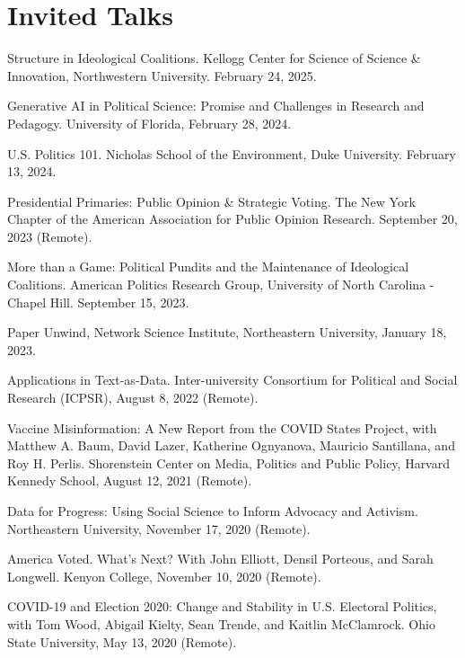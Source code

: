 \documentclass[letterpaper]{article}
\renewenvironment{itemize}{
  \begin{list}{}{
    \setlength{\leftmargin}{1.5em}
  }
}{
  \end{list}
}
\begin{document}
\section*{Invited Talks}
\begin{itemize}

\item Structure in Ideological Coalitions. Kellogg Center for Science of Science \& Innovation, Northwestern University. February 24, 2025.

\item Generative AI in Political Science: Promise and Challenges in Research and Pedagogy. University of Florida, February 28, 2024.

\item U.S. Politics 101. Nicholas School of the Environment, Duke University. February 13, 2024.

\item Presidential Primaries: Public Opinion \& Strategic Voting. The New York Chapter of the American Association for Public Opinion Research. September 20, 2023 (Remote).

\item More than a Game: Political Pundits and the Maintenance of Ideological Coalitions. American Politics Research Group, University of North Carolina - Chapel Hill. September 15, 2023.

\item Paper Unwind, Network Science Institute, Northeastern University, January 18, 2023.

\item Applications in Text-as-Data. Inter-university Consortium for Political and Social Research (ICPSR), August 8, 2022 (Remote). 

\item Vaccine Misinformation: A New Report from the COVID States Project, with Matthew A. Baum, David Lazer, Katherine Ognyanova, Mauricio Santillana, and Roy H. Perlis. Shorenstein Center on Media, Politics and Public Policy, Harvard Kennedy School, August 12, 2021 (Remote).

\item Data for Progress: Using Social Science to Inform Advocacy and Activism. Northeastern University, November 17, 2020 (Remote). 

\item America Voted. What's Next? With John Elliott, Densil Porteous, and Sarah Longwell. Kenyon College, November 10, 2020 (Remote). 

\item COVID-19 and Election 2020: Change and Stability in U.S. Electoral Politics, with Tom Wood, Abigail Kielty, Sean Trende, and Kaitlin McClamrock. Ohio State University, May 13, 2020 (Remote).
 
\end{itemize}
\end{document}
